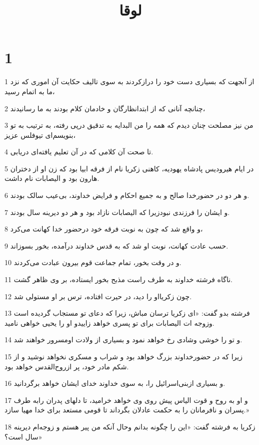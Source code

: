 

\title{لوقا}


\chapter{1}

\par 1 از آنجهت که بسیاری دست خود را درازکردند به سوی تالیف حکایت آن اموری که نزد ما به اتمام رسید،
\par 2 چنانچه آنانی که از ابتدانظارگان و خادمان کلام بودند به ما رسانیدند،
\par 3 من نیز مصلحت چنان دیدم که همه را من البدایه به تدقیق در‌پی رفته، به ترتیب به تو بنویسم‌ای تیوفلس عزیز،
\par 4 تا صحت آن کلامی که در آن تعلیم یافته‌ای دریابی.
\par 5 در ایام هیرودیس پادشاه یهودیه، کاهنی زکریا نام از فرقه ابیا بود که زن او از دختران هارون بود و الیصابات نام داشت.
\par 6 و هر دو در حضورخدا صالح و به جمیع احکام و فرایض خداوند، بی‌عیب سالک بودند.
\par 7 و ایشان را فرزندی نبودزیرا که الیصابات نازاد بود و هر دو دیرینه سال بودند.
\par 8 و واقع شد که چون به نوبت فرقه خود درحضور خدا کهانت می‌کرد،
\par 9 حسب عادت کهانت، نوبت او شد که به قدس خداوند درآمده، بخور بسوزاند.
\par 10 و در وقت بخور، تمام جماعت قوم بیرون عبادت می‌کردند.
\par 11 ناگاه فرشته خداوند به طرف راست مذبح بخور ایستاده، بر وی ظاهر گشت.
\par 12 چون زکریااو را دید، در حیرت افتاده، ترس بر او مستولی شد.
\par 13 فرشته بدو گفت: «ای زکریا ترسان مباش، زیرا که دعای تو مستجاب گردیده است وزوجه ات الیصابات برای تو پسری خواهد زاییدو او را یحیی خواهی نامید.
\par 14 و تو را خوشی وشادی رخ خواهد نمود و بسیاری از ولادت اومسرور خواهند شد.
\par 15 زیرا که در حضورخداوند بزرگ خواهد بود و شراب و مسکری نخواهد نوشید و از شکم مادر خود، پر ازروح‌القدس خواهد بود.
\par 16 و بسیاری ازبنی‌اسرائیل را، به سوی خداوند خدای ایشان خواهد برگردانید.
\par 17 و او به روح و قوت الیاس پیش روی وی خواهد خرامید، تا دلهای پدران رابه طرف پسران و نافرمانان را به حکمت عادلان بگرداند تا قومی مستعد برای خدا مهیا سازد.»
\par 18 زکریا به فرشته گفت: «این را چگونه بدانم وحال آنکه من پیر هستم و زوجه‌ام دیرینه سال است؟»
